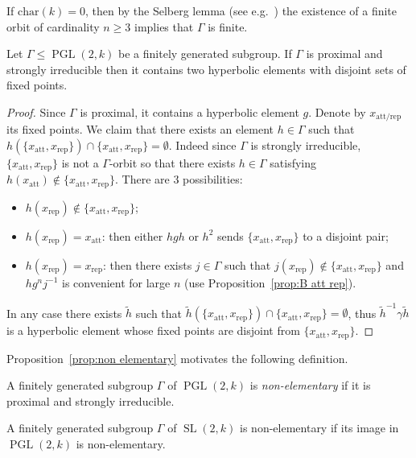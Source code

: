 \documentclass[AHL,Unicode,longabstracts]{cedram}
\DeclareMathOperator{\SL}{SL}
\DeclareMathOperator{\PGL}{PGL}
\newcommand{\att}{\mathrm{att}}
\newcommand{\rep}{\mathrm{rep}}
\newcommand{\PGLk}{\PGL(2, k)}
\newcommand{\inv}{^{-1}}
\begin{document}
\begin{rema}
If $\mathrm{char}(k) = 0$, then by the Selberg lemma (see e.g.~\cite{alperin}) the existence of a finite orbit of cardinality $n\geq 3$ implies that $\Gamma$ is finite.
\end{rema}



\begin{prop}\label{prop:non elementary}
Let $\Gamma\leq \PGLk$ be a finitely generated subgroup. If $\Gamma$ is proximal and strongly irreducible then it contains two hyperbolic elements with disjoint sets of fixed points.
\end{prop}

\begin{proof}
Since $\Gamma$ is proximal, it contains a hyperbolic element $g$. Denote by $x_{\att/\rep}$ its fixed points. We claim that there exists an element $h \in \Gamma$ such that $h(\{ x_\att, x_\rep\}) \cap\{ x_\att, x_\rep\}= \emptyset$. Indeed since $\Gamma$ is strongly irreducible, $\{ x_\att, x_\rep\}$ is not a $\Gamma$-orbit so that there exists $h\in \Gamma$ satisfying $h(x_\att) \notin \{ x_\att, x_\rep\}$. There are 3 possibilities:
\begin{itemize}
\item $h(x_\rep)\notin \{ x_\att, x_\rep\}$;
\item $h(x_\rep) = x_\att$: then either $hgh$ or $h^2$ sends $\{ x_\att, x_\rep\}$ to a disjoint pair;
\item $h(x_\rep) = x_\rep$: then there exists $j\in \Gamma$ such that $j(x_\rep)\notin \{ x_\att, x_\rep\}$ and $hg^nj\inv$ is convenient for large $n$ (use Proposition~\ref{prop:B att rep}).
\end{itemize}
In any case there exists $\tilde{h}$ such that $\tilde{h}(\{ x_\att, x_\rep\})\cap \{ x_\att, x_\rep\}=\emptyset$, thus $\tilde{h}^{- 1} \gamma \tilde{h}$ is a hyperbolic element whose fixed points are disjoint from $\{ x_\att, x_\rep\}$.
\end{proof}

Proposition~\ref{prop:non elementary} motivates the following definition.

\begin{defi}
A finitely generated subgroup $\Gamma$ of $\PGL(2,k)$ is \emph{non-elemen\-tary} if it is proximal and strongly irreducible.

A finitely generated subgroup $\Gamma$ of $\SL(2,k)$ is non-elementary if its image in $\PGL(2,k)$ is non-elementary.
\end{defi}
\end{document}
